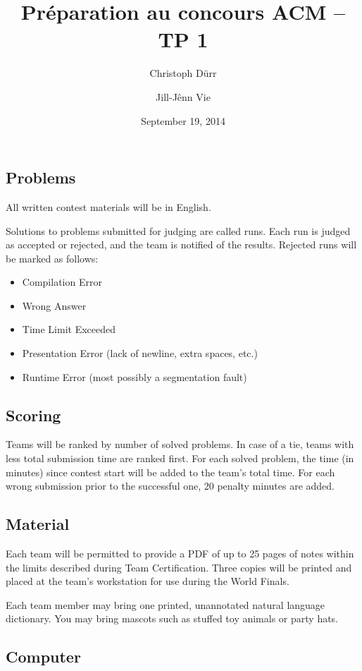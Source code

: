 \documentclass[12pt]{article}
\title{Préparation au concours ACM -- TP 1}
\author{Christoph Dürr \and Jill-Jênn Vie}
\date{September 19, 2014}
\begin{document}
\maketitle
\subsection*{Problems}

All written contest materials will be in English.

Solutions to problems submitted for judging are called runs. Each run is judged as accepted or rejected, and the team is notified of the results. Rejected runs will be marked as follows:
\begin{itemize}
\item Compilation Error
\item Wrong Answer
\item Time Limit Exceeded
\item Presentation Error (lack of newline, extra spaces, etc.)
\item Runtime Error (most possibly a segmentation fault)
\end{itemize}

\subsection*{Scoring}

Teams will be ranked by number of solved problems. In case of a tie, teams with less total submission time are ranked first. For each solved problem, the time (in minutes) since contest start will be added to the team's total time. For each wrong submission prior to the successful one, 20 penalty minutes are added.

\subsection*{Material}

Each team will be permitted to provide a PDF of up to 25 pages of notes within the limits described during Team Certification. Three copies will be printed and placed at the team's workstation for use during the World Finals.

Each team member may bring one printed, unannotated natural language dictionary. You may bring mascots such as stuffed toy animals or party hats.

\subsection*{Computer}
\end{document}
